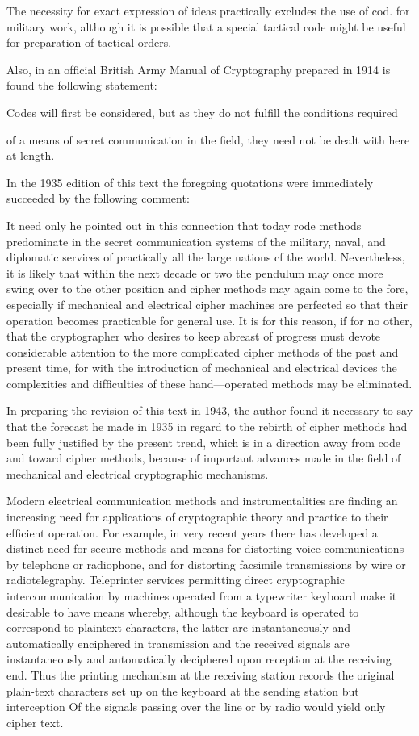 The necessity for exact expression of ideas practically excludes the use of cod.
for military work, although it is possible that a special tactical code might be
useful for preparation of tactical orders.

Also, in an ofﬁcial British Army Manual of Cryptography prepared in
1914 is found the following statement:

Codes will ﬁrst be considered, but as they do not fulﬁll the conditions required

of a means of secret communication in the ﬁeld, they need not be dealt with here
at length.

In the 1935 edition of this text the foregoing quotations were immediately succeeded by the following comment:

It need only he pointed out in this connection that today rode methods predominate in the secret communication systems of the military, naval, and diplomatic
services of practically all the large nations cf the world. Nevertheless, it is likely
that within the next decade or two the pendulum may once more swing over to the
other position and cipher methods may again come to the fore, especially if
mechanical and electrical cipher machines are perfected so that their operation
becomes practicable for general use. It is for this reason, if for no other, that the
cryptographer who desires to keep abreast of progress must devote considerable
attention to the more complicated cipher methods of the past and present time,
for with the introduction of mechanical and electrical devices the complexities and
difﬁculties of these hand—operated methods may be eliminated.

In preparing the revision of this text in 1943, the author found it necessary to say that the forecast he made in 1935 in regard to the rebirth of
cipher methods had been fully justiﬁed by the present trend, which is in
a direction away from code and toward cipher methods, because of
important advances made in the ﬁeld of mechanical and electrical cryptographic mechanisms.

\mypara Modern electrical communication methods and instrumentalities are
ﬁnding an increasing need for applications of cryptographic theory and
practice to their efﬁcient operation. For example, in very recent years
there has developed a distinct need for secure methods and means for
distorting voice communications by telephone or radiophone, and
for distorting facsimile transmissions by wire or radiotelegraphy. Teleprinter services permitting direct cryptographic intercommunication by
machines operated from a typewriter keyboard make it desirable to have
means whereby, although the keyboard is operated to correspond to plaintext characters, the latter are instantaneously and automatically
enciphered in transmission and the received signals are instantaneously
and automatically deciphered upon reception at the receiving end. Thus
the printing mechanism at the receiving station records the original
plain-text characters set up on the keyboard at the sending station but
interception Of the signals passing over the line or by radio would yield
only cipher text.


